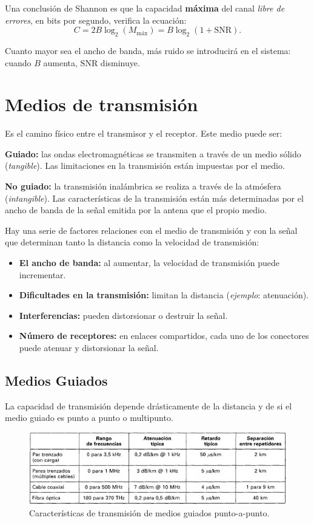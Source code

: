 \documentclass[10pt,a4paper]{article}
\begin{document}
Una conclusión de Shannon es que la capacidad \textbf{máxima} del canal \textit{libre de errores}, en bits por segundo, verifica la ecuación:
\[C=2B\log_2(M_\text{máx})=B\log_2(1+\text{SNR}).\]

Cuanto mayor sea el ancho de banda, más ruido se introducirá en el sistema: cuando $B$ aumenta, $\text{SNR}$ disminuye.

\section{Medios de transmisión}

Es el camino físico entre el transmisor y el receptor. Este medio puede ser:
\begin{description}
\item \textbf{Guiado:} las ondas electromagnéticas se transmiten a través de un medio sólido (\textit{tangible}). Las limitaciones en la transmisión están impuestas por el medio.
\item \textbf{No guiado:} la transmisión inalámbrica se realiza a través de la atmósfera (\textit{intangible}). Las características de la transmisión están más determinadas por el ancho de banda de la señal emitida por la antena que el propio medio.
\end{description}

Hay una serie de factores relaciones con el medio de transmisión y con la señal que determinan tanto la distancia como la velocidad de transmisión:
\begin{itemize}
\item \textbf{El ancho de banda:} al aumentar, la velocidad de transmisión puede incrementar.
\item \textbf{Dificultades en la transmisión:} limitan la distancia (\textit{ejemplo}: atenuación).
\item \textbf{Interferencias:} pueden distorsionar o destruir la señal.
\item \textbf{Número de receptores:} en enlaces compartidos, cada uno de los conectores puede atenuar y distorsionar la señal.
\end{itemize}

\subsection{Medios Guiados}
La capacidad de transmisión depende drásticamente de la distancia y de si el medio guiado es punto a punto o multipunto.

\begin{figure}[ht!]
  \caption{Características de transmisión de medios guiados punto-a-punto.}
  \label{fig:mediospuntoapunto}  
  \centerline{
	\includegraphics[width=\textwidth-\fboxrule-\fboxrule]{imgs/mediospuntoapunto.png}}
\end{figure}
\end{document}
